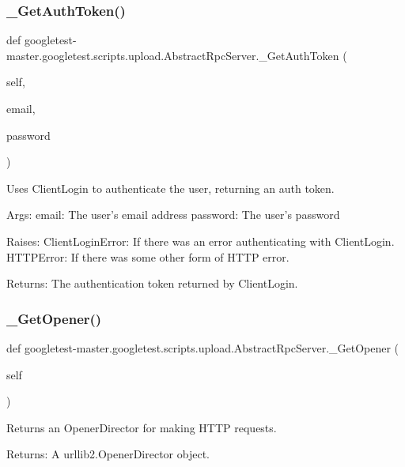 \subsubsection{\texorpdfstring{\_GetAuthToken()}{\_GetAuthToken()}}
{\footnotesize\ttfamily def googletest-\/master.\+googletest.\+scripts.\+upload.\+Abstract\+Rpc\+Server.\+\_\+\+Get\+Auth\+Token (\begin{DoxyParamCaption}\item[{}]{self,  }\item[{}]{email,  }\item[{}]{password }\end{DoxyParamCaption})\hspace{0.3cm}{\ttfamily [private]}}

\begin{DoxyVerb}Uses ClientLogin to authenticate the user, returning an auth token.

Args:
  email:    The user's email address
  password: The user's password

Raises:
  ClientLoginError: If there was an error authenticating with ClientLogin.
  HTTPError: If there was some other form of HTTP error.

Returns:
  The authentication token returned by ClientLogin.
\end{DoxyVerb}
 \mbox{\label{classgoogletest-master_1_1googletest_1_1scripts_1_1upload_1_1_abstract_rpc_server_a6062a1fe65aa19d8b4ed86e34eabbf95}} 
\subsubsection{\texorpdfstring{\_GetOpener()}{\_GetOpener()}}
{\footnotesize\ttfamily def googletest-\/master.\+googletest.\+scripts.\+upload.\+Abstract\+Rpc\+Server.\+\_\+\+Get\+Opener (\begin{DoxyParamCaption}\item[{}]{self }\end{DoxyParamCaption})\hspace{0.3cm}{\ttfamily [private]}}

\begin{DoxyVerb}Returns an OpenerDirector for making HTTP requests.

Returns:
  A urllib2.OpenerDirector object.
\end{DoxyVerb}
 

